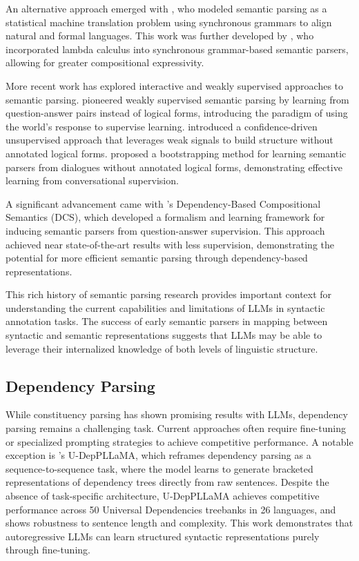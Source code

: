 An alternative approach emerged with \citet{wong2006learning}, who modeled semantic parsing as a statistical machine translation problem using synchronous grammars to align natural and formal languages. This work was further developed by \citet{wong2007}, who incorporated lambda calculus into synchronous grammar-based semantic parsers, allowing for greater compositional expressivity.

More recent work has explored interactive and weakly supervised approaches to semantic parsing. \citet{clarke2010} pioneered weakly supervised semantic parsing by learning from question-answer pairs instead of logical forms, introducing the paradigm of using the world's response to supervise learning. \citet{goldwasser2011confidence} introduced a confidence-driven unsupervised approach that leverages weak signals to build structure without annotated logical forms. \citet{artzi2011} proposed a bootstrapping method for learning semantic parsers from dialogues without annotated logical forms, demonstrating effective learning from conversational supervision.

A significant advancement came with \citet{liang2013learning}'s Dependency-Based Compositional Semantics (DCS), which developed a formalism and learning framework for inducing semantic parsers from question-answer supervision. This approach achieved near state-of-the-art results with less supervision, demonstrating the potential for more efficient semantic parsing through dependency-based representations.

This rich history of semantic parsing research provides important context for understanding the current capabilities and limitations of LLMs in syntactic annotation tasks. The success of early semantic parsers in mapping between syntactic and semantic representations suggests that LLMs may be able to leverage their internalized knowledge of both levels of linguistic structure.

\subsection{Dependency Parsing}

While constituency parsing has shown promising results with LLMs, dependency parsing remains a challenging task. Current approaches often require fine-tuning or specialized prompting strategies to achieve competitive performance. A notable exception is \citet{hromei2024udeppllama}'s U-DepPLLaMA, which reframes dependency parsing as a sequence-to-sequence task, where the model learns to generate bracketed representations of dependency trees directly from raw sentences. Despite the absence of task-specific architecture, U-DepPLLaMA achieves competitive performance across 50 Universal Dependencies treebanks in 26 languages, and shows robustness to sentence length and complexity. This work demonstrates that autoregressive LLMs can learn structured syntactic representations purely through fine-tuning.

